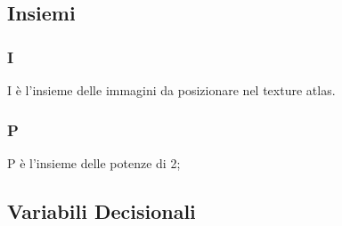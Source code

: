 \iffalse
		\subsection{Variabili Decisionali}

		Bef{x,y}
		\subsection{Parametri}
		W
		H
		useBleding
		usePowTwo
		useRotation
		\subsection{Vincoli e funzione obiettivo}
		min D

		Cx Cy
		\newpage
\fi



\iffalse
Changelog del modello


Il modello è passato per più fasi incrementali:
* La prima versione risolve il problema base
* Quindi è stato aggiunto il supporto per il bleeding
* La terza versione ha aggiunto la possibilità di ruotare le immagini
* La quarta e ultima versione permette di fissare la dimensione della texture atlas a potenze di 2
\fi





\subsection{Insiemi}
\subsubsection{I}
I è l'insieme delle immagini da posizionare nel texture atlas.

\subsubsection{P}
P è l'insieme delle potenze di 2;


\renewcommand{\Xi}{X\textsubscript{i}}
\newcommand{\Yi}{Y\textsubscript{i}}
\newcommand{\Wi}{W\textsubscript{i}}
\newcommand{\Hi}{H\textsubscript{i}}
\newcommand{\beforeXij}{beforeX\textsubscript{i,j}}
\newcommand{\beforeYij}{beforeY\textsubscript{i,j}}
\newcommand{\ri}{r\textsubscript{i}}

\newcommand{\isTp}{is2\textsubscript{p}}

\subsection{Variabili Decisionali}

